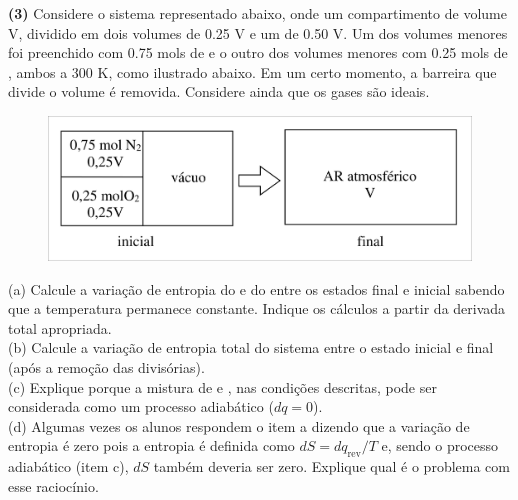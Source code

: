 \textbf{(3)} Considere o sistema representado abaixo, onde um compartimento de
volume V, dividido em dois volumes de \num{0,25} V e um de \num{0,50} V. Um dos volumes
menores foi preenchido com \num{0,75} mols de  e o outro dos volumes menores com
\num{0,25} mols de , ambos a 300 K, como ilustrado abaixo. Em um certo momento, a
barreira que divide o volume é removida.  Considere ainda que os gases são
ideais.\\

\begin{figure}[H]
    \centering
    \includegraphics[width=.8\linewidth]{Q3.png}
\end{figure}

(a) Calcule a variação de entropia do  e do  entre os estados
final e inicial sabendo que a temperatura permanece constante. Indique os
cálculos a partir da derivada total apropriada.\\

(b) Calcule a variação de entropia total do sistema entre o estado inicial e
final (após a remoção das divisórias).\\

(c) Explique porque a mistura de  e , nas condições descritas,
pode ser considerada como um processo adiabático (\(dq= 0\)).\\

(d) Algumas vezes os alunos respondem o item a dizendo que a variação de
entropia é zero pois a entropia é definida como \(dS= dq_{\text{rev}}/T\) e,
sendo o processo adiabático (item c), \(dS\) também deveria ser zero. Explique
qual é o problema com esse raciocínio.\\
